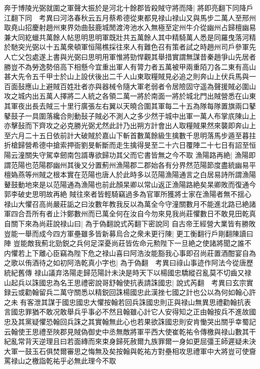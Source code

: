 奔于博陵光弼就圍之軍聲大振於是河北十餘郡皆殺賊守將而降|{
	將即亮翻下同降戶江翻下同　考異曰河洛春秋云五月蔡希德從東都見禄山禄山又與馬步二萬人至邢州取堯山招慶射趙州東界効曲鼔鹿城閒渡洿池水入無極至定州牛介從幽州占歸檀幽易兼大同紇蠟共萬餘人帖思明思明軍既壯共五萬餘人其中精騎萬人悉是同羅曳落河精於馳突光弼以十五萬衆頓軍恒陽樵採往來人有難色召有策者試之時趙州司戶參軍先人亡父包處遂上書與光弼曰思明用軍惟將勁悍觀其舉措實謂無謀昔秦趙爭山先居者勝豈不為勞逸勢倍高下相懸今宜重出軍人有膂力者五萬被甲兩重陌刀各二東有高山甚大先令五千甲士於山上設伏後出二千人山東取糧賊見必追之則奔山上伏兵馬與一百面鼔應山上避賊百姓壯者亦與器械令隨大軍老弱者令居險固守遥為聲援賊必圍山攻之城内出五萬人擇將二人統之各領二萬一將於南面一將於城北門出賊營悉在山東其軍夜出長去賊三十里行廣張左右翼以天曉合圍其軍每二十五為隊每隊置旗兩口鼕鼕鼓子一具圍落纔合則動鼔子賊必不測人之多少然于城中出軍一萬人布掌㡳陳山上亦擊鼔而下齊攻之必克勝光弼尤然此計乃出朔方計會出人取糧賊果然來襲即奔山上至六月二十五日依前計大破賊於嘉山下斬首數萬餘級生擒數千思明落馬步遁至暮拄折槍歸營希德中搶索押衙劉旻斬斷而走生擒得旻至二十六日覆陣二十七日有詔至恒陽云潼關失守駕幸劒南包諝專欲歸功其父而它書皆無之今不取}
漁陽路再絶|{
	漁陽即謂范陽也范陽郡幽州其後又分置薊州漁陽郡二郡始各有分界然范陽節度盡統幽易平檀媯燕等州賊之根本實在范陽也唐人於此時多以范陽漁陽通言之白居易詩所謂漁陽鼙鼓動地來是以范陽通為漁陽也前此顏杲卿以常山返正漁陽路絶矣杲卿敗而復通今郭李破史思明故再絶}
賊往來者皆輕騎竊過多為官軍所獲將士家在漁陽者無不揺心禄山大懼召高尚嚴莊詬之曰汝數年教我反以為萬全今守潼關數月不能進北路已絶諸軍四合吾所有者止汴鄭數州而已萬全何在汝自今勿來見我尚莊懼數日不敢見田乾真自關下來為尚莊說禄山曰|{
	為于偽翻說式芮翻下密說同}
自古帝王經營大業皆有勝敗豈能一舉而成今四方軍壘雖多皆新募烏合之衆未更行陳|{
	更工衡翻行戶剛翻陳讀曰陣}
豈能敵我薊北勁鋭之兵何足深憂尚莊皆佐命元勲陛下一旦絶之使諸將聞之誰不内懼若上下離心臣竊為陛下危之禄山喜曰阿浩汝能豁我心事即召尚莊置酒酣宴自為之歌以侑酒待之如初阿浩乾真小字也|{
	為于偽翻　考異曰祿山事迹作阿法今從唐歷統紀舊傳}
禄山議弃洛陽走歸范陽計未決是時天下以楊國忠驕縱召亂莫不切齒又禄山起兵以誅國忠為名王思禮密說哥舒翰使抗表請誅國忠|{
	說式芮翻　考異曰玄宗實録云或勸翰留兵二萬守關悉以精鋭回誅楊國忠此漢挫七國之計也公以為何如翰心許之未有客泄其謀于國忠國忠大懼按翰若回兵誅國忠則正與禄山無異思禮勸翰抗表言國忠罪猶不敢况敢舉兵乎事必不然且翰雖心計它人安得知之正由翰按兵不進故國忠及其黨疑懼恐翰回兵誅之其實翰無此心也若果欲誅國忠則安肯慟哭出關乎幸蜀記云翰使王思禮至陜郡見賊偽御史中丞無敵將軍平西大使崔乾祐令傳檄與禄山數其干紀亂常背天逆理且曰若面縳而來束身歸死赦爾九族罪爾一身如更屈彊王師遲疑未決大軍一鼓玉石俱焚爾審思之悔無及矣按翰與乾祐方對壘相攻思禮軍中大將豈可使齎罵禄山之檄詣乾祐乎必無此理今不取}
